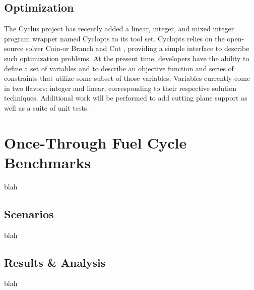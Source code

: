 \documentclass{anstrans}
\begin{document}
\subsection{Optimization}
The Cyclus project has recently added a linear, integer, and mixed integer program wrapper named Cyclopts \cite{cyclopts2012} to its tool set. Cyclopts relies on the
open-source solver Coin-or Branch and Cut \cite{coinCBC}, providing a simple interface to describe such optimization problems. At the present time,
developers have the ability to define a set of variables and to describe an objective function and series of constraints that utilize some subset
of those variables. Variables currently come in two flavors: integer and linear, corresponding to their respective solution techniques. Additional
work will be performed to add cutting plane support as well as a suite of unit tests.
\section{Once-Through Fuel Cycle Benchmarks}
blah
\subsection{Scenarios}
blah
\subsection{Results \& Analysis}
blah


\end{document}
